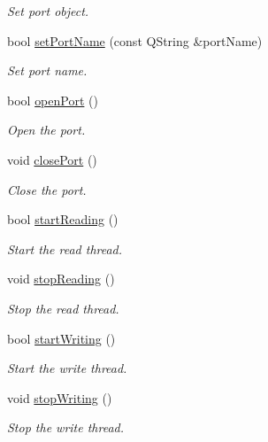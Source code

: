 \begin{DoxyCompactItemize}
\begin{DoxyCompactList}\small\item\em Set port object. \end{DoxyCompactList}\item 
bool \hyperlink{classmdt_port_manager_a647f85027ac2ed695a88f23c9f9167eb}{setPortName} (const QString \&portName)
\begin{DoxyCompactList}\small\item\em Set port name. \end{DoxyCompactList}\item 
bool \hyperlink{classmdt_port_manager_aab594613e8985590c835194efbc27b5e}{openPort} ()
\begin{DoxyCompactList}\small\item\em Open the port. \end{DoxyCompactList}\item 
void \hyperlink{classmdt_port_manager_ace8065f1f5083041ee7f65c2892bc77d}{closePort} ()
\begin{DoxyCompactList}\small\item\em Close the port. \end{DoxyCompactList}\item 
bool \hyperlink{classmdt_port_manager_a696c2d649764ba7b5f299b0a8f3e5cc4}{startReading} ()
\begin{DoxyCompactList}\small\item\em Start the read thread. \end{DoxyCompactList}\item 
void \hyperlink{classmdt_port_manager_a6a06371d61f8f227df2806cde2ac1d11}{stopReading} ()
\begin{DoxyCompactList}\small\item\em Stop the read thread. \end{DoxyCompactList}\item 
bool \hyperlink{classmdt_port_manager_ac769ac4eb2b43a5a37be5b5d2a7bccbc}{startWriting} ()
\begin{DoxyCompactList}\small\item\em Start the write thread. \end{DoxyCompactList}\item 
void \hyperlink{classmdt_port_manager_a29b0d41eb5b72ef58031e4b7c96bb7e5}{stopWriting} ()
\begin{DoxyCompactList}\small\item\em Stop the write thread. \end{DoxyCompactList}\item 

\end{DoxyCompactItemize}
